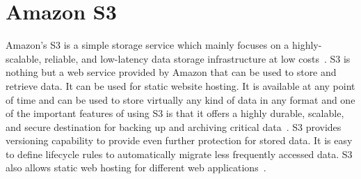 \section{Amazon S3}

Amazon's S3 is a simple storage service which mainly focuses on a
highly-scalable, reliable, and low-latency data storage infrastructure at low
costs~\cite{hid-sp18-420-amazon-S3-FAQ}. S3 is nothing but a web service
provided by Amazon that can be used to store and retrieve data. It can be used
for static website hosting. It is available at any point of time and can be used
to store virtually any kind of data in any format and one of the important
features of using S3 is that it offers a highly durable, scalable, and secure
destination for backing up and archiving critical
data~\cite{hid-sp18-420-amazon-S3}. S3 provides versioning capability to provide
even further protection for stored data. It is easy to define lifecycle rules to
automatically migrate less frequently accessed data. S3 also allows static web
hosting for different web applications~\cite{hid-sp18-420-amazon-S3}.
